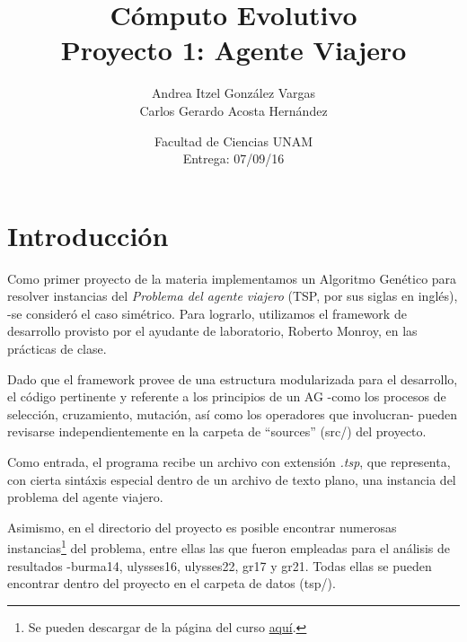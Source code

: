 \documentclass[12pt]{article}
\title{Cómputo Evolutivo \\ Proyecto 1: Agente Viajero}
\author{Andrea Itzel González Vargas \\
  Carlos Gerardo Acosta Hernández}
\date{Facultad de Ciencias UNAM \\ Entrega: 07/09/16}
\begin{document}
\maketitle
\section{Introducción}
Como primer proyecto de la materia implementamos un Algoritmo Genético
para resolver instancias del
\textit{Problema del agente viajero} (TSP, por sus siglas en inglés),
-se consideró el caso simétrico.
Para lograrlo, utilizamos el framework de desarrollo provisto por el
ayudante de laboratorio, Roberto Monroy, en las prácticas de clase.\par
Dado que el framework provee de
una estructura modularizada para el desarrollo, el código pertinente y
referente a los principios de un AG -como los procesos de selección,
cruzamiento, mutación, así como los operadores que involucran- pueden
revisarse independientemente en la carpeta de ``sources'' (src/) del proyecto.\par
Como entrada, el programa recibe un archivo con extensión \textit{.tsp},
que representa, con cierta sintáxis especial dentro de un archivo de texto plano,
una instancia del problema del agente viajero.\par
Asimismo, en el directorio del proyecto
es posible encontrar numerosas instancias\footnote{Se pueden descargar de la página del curso \href{https://sites.google.com/site/unamfcienciascomputoevolutivo/assignments/assignment1/tsp.tar.gz}{aquí}.} del problema, entre ellas las que
fueron empleadas para el análisis de resultados -burma14, ulysses16, ulysses22, gr17 y gr21.
Todas ellas se pueden encontrar dentro del proyecto en el carpeta de datos (tsp/).\par
\end{document}
